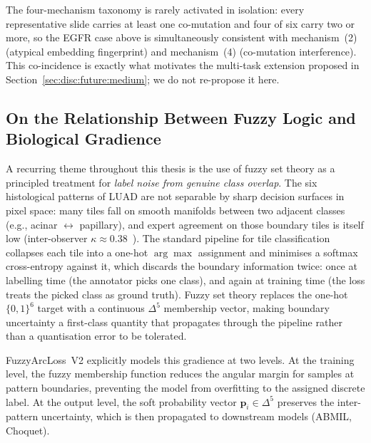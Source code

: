 The four-mechanism taxonomy is rarely activated in isolation: every
representative slide carries at least one co-mutation and four of
six carry two or more, so the EGFR case above is simultaneously
consistent with mechanism~(2) (atypical embedding fingerprint) and
mechanism~(4) (co-mutation interference).
This co-incidence is exactly what motivates the multi-task
extension proposed in
Section~\ref{sec:disc:future:medium}; we do not re-propose it
here.


\subsection{On the Relationship Between Fuzzy Logic and Biological Gradience}
\label{sec:disc:interp:fuzzy}

A recurring theme throughout this thesis is the use of fuzzy set
theory as a principled treatment for \emph{label noise from
genuine class overlap}.
The six histological patterns of LUAD are not separable by sharp
decision surfaces in pixel space: many tiles fall on smooth
manifolds between two adjacent classes (e.g., acinar
$\leftrightarrow$ papillary), and expert agreement on those
boundary tiles is itself low (inter-observer
$\kappa \approx 0.38$~\cite{thunnissen2012reproducibility}).
The standard pipeline for tile classification collapses each tile
into a one-hot $\arg\max$ assignment and minimises a softmax
cross-entropy against it, which discards the boundary information
twice: once at labelling time (the annotator picks one class), and
again at training time (the loss treats the picked class as
ground truth).
Fuzzy set theory replaces the one-hot $\{0,1\}^6$ target with a
continuous $\Delta^5$ membership vector, making boundary
uncertainty a first-class quantity that propagates through the
pipeline rather than a quantisation error to be tolerated.

FuzzyArcLoss~V2 explicitly models this gradience at two levels.
At the training level, the fuzzy membership function reduces the angular margin for samples at pattern boundaries, preventing the model from overfitting to the assigned discrete label.
At the output level, the soft probability vector $\mathbf{p}_i \in \Delta^5$ preserves the inter-pattern uncertainty, which is then propagated to downstream models (ABMIL, Choquet).

